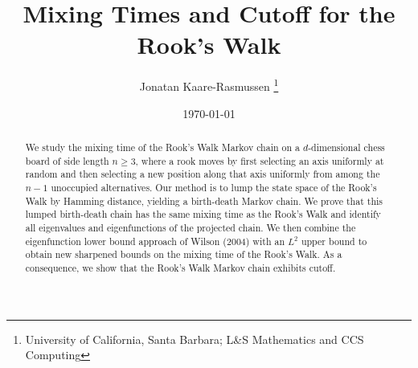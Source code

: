 \documentclass{article}
\theoremstyle{definition}
\theoremstyle{definition}
\theoremstyle{definition}
\theoremstyle{definition}
\theoremstyle{named}
\begin{document}
   \title{Mixing Times and Cutoff for the Rook's Walk} 
   \author{Jonatan Kaare-Rasmussen
   \thanks{University of California, Santa Barbara; 
   L\&S Mathematics and CCS Computing}}

   \date{\today}
   \maketitle

   \begin{abstract}
   We study the mixing time of the Rook's Walk Markov chain on a $d$-dimensional chess board of side length $n\geq 3$, where a rook moves by first selecting an axis uniformly at random and then selecting a new position along that axis uniformly from among the $n-1$ unoccupied alternatives. Our method is to lump the state space of the Rook's Walk by Hamming distance, yielding a birth-death Markov chain. We prove that this lumped birth-death chain has the same mixing time as the Rook's Walk and identify all eigenvalues and eigenfunctions of the projected chain. We then combine the eigenfunction lower bound approach of Wilson (2004) with an $L^2$ upper bound to obtain new sharpened bounds on the mixing time of the Rook's Walk. As a consequence, we show that the Rook's Walk Markov chain exhibits cutoff.
   \end{abstract}
\end{document}
